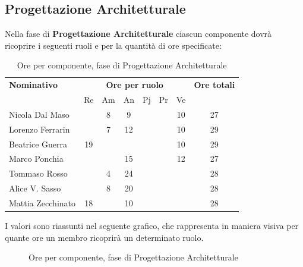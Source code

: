 \subsection{Progettazione Architetturale}
Nella fase di \textbf{Progettazione Architetturale} ciascun componente dovrà ricoprire i seguenti ruoli e per la quantità di ore specificate:

\begin{table}[H]
	\centering
	\begin{tabular}{|l|c|c|c|c|c|c|c|}
		\hline
		\textbf{Nominativo} & 
		\multicolumn{6}{c|}{\textbf{Ore per ruolo}} & 
		\textbf{Ore totali} \\
		& Re & Am & An & Pj & Pr & Ve & \\
		\hline
		Nicola Dal Maso & & 8 & 9 & & & 10 & 27 \\
		Lorenzo Ferrarin & & 7 & 12 & & & 10 & 29 \\
		Beatrice Guerra & 19 & & & & & 10 & 29 \\
		Marco Ponchia & & & 15 & & & 12 & 27 \\
		Tommaso Rosso & & 4 & 24 & & & & 28 \\
		Alice V. Sasso & & 8 & 20 & & & & 28 \\
		Mattia Zecchinato & 18 & & 10 & & & & 28 \\
		\hline
	\end{tabular}
	\caption{Ore per componente, fase di Progettazione Architetturale}
\end{table}
I valori sono riassunti nel seguente grafico, che rappresenta in maniera visiva per quante ore un membro ricoprirà un determinato ruolo.
\begin{figure}[H]
	\centering
	\caption{Ore per componente, fase di Progettazione Architetturale}
\end{figure}

